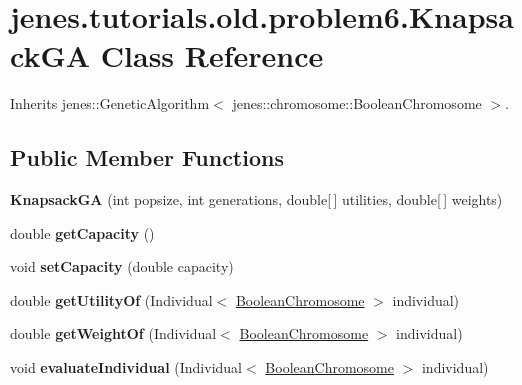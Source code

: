 \hypertarget{classjenes_1_1tutorials_1_1old_1_1problem6_1_1_knapsack_g_a}{
\section{jenes.tutorials.old.problem6.KnapsackGA Class Reference}
\label{classjenes_1_1tutorials_1_1old_1_1problem6_1_1_knapsack_g_a}
}
Inherits jenes::GeneticAlgorithm$<$ jenes::chromosome::BooleanChromosome $>$.

\subsection*{Public Member Functions}
\begin{CompactItemize}
\item 
\hypertarget{classjenes_1_1tutorials_1_1old_1_1problem6_1_1_knapsack_g_a_422824d96285c3b2f61c4fc7b827740b}{
\textbf{KnapsackGA} (int popsize, int generations, double\mbox{[}$\,$\mbox{]} utilities, double\mbox{[}$\,$\mbox{]} weights)}
\label{classjenes_1_1tutorials_1_1old_1_1problem6_1_1_knapsack_g_a_422824d96285c3b2f61c4fc7b827740b}

\item 
\hypertarget{classjenes_1_1tutorials_1_1old_1_1problem6_1_1_knapsack_g_a_d781c31a74a81403fed4c9d366debd39}{
double \textbf{getCapacity} ()}
\label{classjenes_1_1tutorials_1_1old_1_1problem6_1_1_knapsack_g_a_d781c31a74a81403fed4c9d366debd39}

\item 
\hypertarget{classjenes_1_1tutorials_1_1old_1_1problem6_1_1_knapsack_g_a_48beb6d0837db170693758d40fa3fcd0}{
void \textbf{setCapacity} (double capacity)}
\label{classjenes_1_1tutorials_1_1old_1_1problem6_1_1_knapsack_g_a_48beb6d0837db170693758d40fa3fcd0}

\item 
\hypertarget{classjenes_1_1tutorials_1_1old_1_1problem6_1_1_knapsack_g_a_1afed02357ac8bd62bf23b34132a1c30}{
double \textbf{getUtilityOf} (Individual$<$ \hyperlink{classjenes_1_1chromosome_1_1_boolean_chromosome}{BooleanChromosome} $>$ individual)}
\label{classjenes_1_1tutorials_1_1old_1_1problem6_1_1_knapsack_g_a_1afed02357ac8bd62bf23b34132a1c30}

\item 
\hypertarget{classjenes_1_1tutorials_1_1old_1_1problem6_1_1_knapsack_g_a_3fad8fde8f1c75f2f39665b872578551}{
double \textbf{getWeightOf} (Individual$<$ \hyperlink{classjenes_1_1chromosome_1_1_boolean_chromosome}{BooleanChromosome} $>$ individual)}
\label{classjenes_1_1tutorials_1_1old_1_1problem6_1_1_knapsack_g_a_3fad8fde8f1c75f2f39665b872578551}

\item 
\hypertarget{classjenes_1_1tutorials_1_1old_1_1problem6_1_1_knapsack_g_a_4a5ada923a1c65269c5cea2431865df5}{
void \textbf{evaluateIndividual} (Individual$<$ \hyperlink{classjenes_1_1chromosome_1_1_boolean_chromosome}{BooleanChromosome} $>$ individual)}
\label{classjenes_1_1tutorials_1_1old_1_1problem6_1_1_knapsack_g_a_4a5ada923a1c65269c5cea2431865df5}

\end{CompactItemize}


